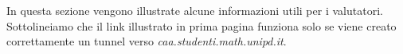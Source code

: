 In questa sezione vengono illustrate alcune informazioni utili per i valutatori.
Sottolineiamo che il link illustrato in prima pagina funziona solo se viene creato correttamente un tunnel verso
\textit{caa.studenti.math.unipd.it}.